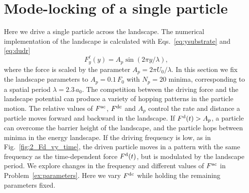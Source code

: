 \documentclass[preprint,showpacs,preprintnumbers,amsmath,amssymb,aps,prb]{revtex4-1}
\theoremstyle{remark}
\begin{document}
\section{Mode-locking of a single particle}
\label{sec:results}
Here we drive 
a single particle 
across the landscape. 
The numerical implementation of the landscape 
is calculated with Eqs.~\eqref{eq:ysubstrate} and \eqref{eq:dudr}  %
\begin{equation}
  \label{eq:force}
  F^\ell_y(y) = A_{p} \sin{(2 \pi y / \lambda)},
\end{equation}
where the force is scaled by the parameter $A_{p} = 2\pi U_0/\lambda$.
In this section we fix the landscape parameters
to $A_{p} = 0.1\,F_0$ 
with $N_p=20$ minima, 
corresponding to a spatial period $\lambda = 2.3\,a_0$.
The competition between the driving force and the landscape potential
can produce a variety of hopping patterns in the particle motion. 
The relative values of $F^{\rm ac}$, $F^{\rm dc}$ and $A_p$
control the rate and distance a  particle moves 
forward and backward in the landscape.
If $F^{\rm d}(t) > A_p$, a particle can 
overcome the barrier height of the landscape,
and 
the particle hops between minima in the energy landscape.
If the driving frequency is low,
as in Fig.~\ref{fig:2_Fd_vy_time},  
the driven particle 
moves 
in a pattern 
with the same frequency 
as the time-dependent force $F^{\rm d}(t)$,
but is modulated by the landscape period.
We explore changes in the frequency and different values of $F^{\rm ac}$ 
in Problem~\ref{ex:parameters}.
Here we vary $F^{\rm dc}$ 
while holding the remaining parameters fixed.
\end{document}
